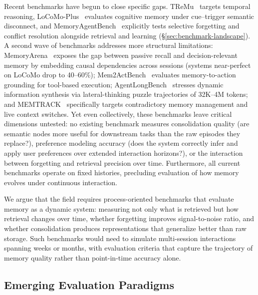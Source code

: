 Recent benchmarks have begun to close specific gaps.
TReMu~\cite{ge2025tremu} targets temporal reasoning,
LoCoMo-Plus~\cite{li2026locomoplus} evaluates cognitive memory under
cue--trigger semantic disconnect, and
MemoryAgentBench~\cite{hu2025mab} explicitly tests selective forgetting
and conflict resolution alongside retrieval and learning
(\S\ref{sec:benchmark-landscape}).  A second wave of benchmarks
addresses more structural limitations:
MemoryArena~\cite{memoryarena2026} exposes the gap between passive
recall and decision-relevant memory by embedding causal dependencies
across sessions (systems near-perfect on LoCoMo drop to 40--60\%);
Mem2ActBench~\cite{mem2actbench2026} evaluates memory-to-action
grounding for tool-based execution; AgentLongBench~\cite{agentlongbench2026}
stresses dynamic information synthesis via lateral-thinking puzzle
trajectories of 32K--4M tokens; and
MEMTRACK~\cite{memtrack2025} specifically targets contradictory memory
management and live context switches.  Yet even collectively, these
benchmarks leave critical dimensions untested: no existing benchmark
measures consolidation quality (are semantic nodes more useful for
downstream tasks than the raw episodes they replace?), preference
modeling accuracy (does the system correctly infer and apply user
preferences over extended interaction horizons?), or the interaction
between forgetting and retrieval precision over time.  Furthermore,
all current benchmarks operate on fixed histories, precluding evaluation
of how memory evolves under continuous interaction.

We argue that the field requires process-oriented benchmarks that
evaluate memory as a dynamic system: measuring not only what is
retrieved but how retrieval changes over time, whether forgetting
improves signal-to-noise ratio, and whether consolidation produces
representations that generalize better than raw storage.  Such
benchmarks would need to simulate multi-session interactions spanning
weeks or months, with evaluation criteria that capture the trajectory
of memory quality rather than point-in-time accuracy alone.

\subsection{Emerging Evaluation Paradigms}
\label{sec:new-benchmarks}

